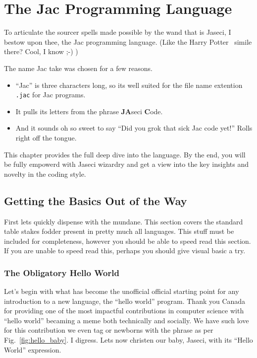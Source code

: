 \chapter{The Jac Programming Language}

To articulate the sourcer spells made possible by the wand that is Jaseci, I bestow upon thee, the Jac programming language. (Like the Harry Potter~\cite{harrypotter} simile there? Cool, I know ;-) )
\par
The name Jac take was chosen for a few reasons.
\begin{itemize}
    \item ``Jac'' is three characters long, so its well suited for the file name extention \texttt{.jac} for Jac programs.
    \item It pulls its letters from the phrase \textbf{JA}seci \textbf{C}ode.
    \item And it sounds oh so sweet to say ``Did you \gls{grok} that \gls{sick} Jac code yet!'' Rolls right off the tongue.
\end{itemize}
\par
This chapter provides the full deep dive into the language. By the end, you will be fully empowerd with Jaseci wizardry and get a view into the key insights and novelty in the coding style.

\section{Getting the Basics Out of the Way}
First lets quickly dispense with the mundane. This section covers the standard table stakes fodder present in pretty much all languages. This stuff must be included for completeness, however you should be able to speed read this section.  If you are unable to speed read this, perhaps you should give visual basic a try.
\subsection{The Obligatory Hello World}\printfigHelloWorldBaby
Let's begin with what has become the unofficial official starting point for any introduction to a new language, the ``hello world'' program. Thank you Canada for providing one of the most impactful contributions in computer science with ``hello world'' becaming a meme both technically and socially. We have such love for this contribution we even tag or newborns with the phrase as per Fig.~\ref{fig:hello_baby}. I digress. Lets now \gls{christen} our baby, Jaseci, with its ``Hello World'' expression.

